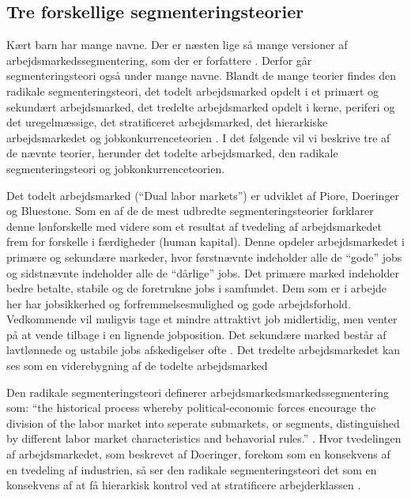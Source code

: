 \subsection{Tre forskellige segmenteringsteorier}

Kært barn har mange navne. Der er næsten lige så mange versioner af arbejdsmarkedssegmentering, som der er forfattere \parencite[77]{Leontaridi1998}. Derfor går segmenteringsteori også under mange navne. Blandt de mange teorier findes den radikale segmenteringsteori, det todelt arbejdsmarked opdelt i et primært og sekundært arbejdsmarked, det tredelte arbejdsmarked opdelt i kerne, periferi og det uregelmæssige, det stratificeret arbejdsmarked, det hierarkiske arbejdsmarkedet og jobkonkurrenceteorien \parencite[1215]{Cain1976}. I det følgende vil vi beskrive tre af de nævnte teorier, herunder det todelte arbejdsmarked, den radikale segmenteringsteori og jobkonkurrenceteorien.

Det todelt arbejdsmarked (“Dual labor markets”) er udviklet af Piore, Doeringer og Bluestone. Som en af de de mest udbredte segmenteringsteorier forklarer denne lønforskelle med videre som et resultat af tvedeling af arbejdsmarkedet frem for forskelle i færdigheder (human kapital). Denne opdeler arbejdsmarkedet i primære og sekundære markeder, hvor førstnævnte indeholder alle de “gode” jobs og sidstnævnte indeholder alle de “dårlige” jobs. Det primære marked indeholder bedre betalte, stabile og de foretrukne jobs i samfundet. Dem som er i arbejde her har jobsikkerhed og forfremmelsesmulighed og gode arbejdsforhold. Vedkommende vil muligvis tage et mindre attraktivt job midlertidig, men venter på at vende tilbage i en lignende jobposition. Det sekundære marked består af lavtlønnede og ustabile jobs afskedigelser ofte \parencite[70]{Doeringer1971}. Det tredelte arbejdsmarkedet kan ses som en viderebygning af de todelte arbejdsmarked

Den radikale segmenteringsteori definerer arbejdsmarkedsmarkedssegmentering som: “the historical process whereby political-economic forces encourage the division of the labor market into seperate submarkets, or segments, distinguished by different labor market characteristics and behavorial rules.” \parencite[359]{Reich1973}. Hvor tvedelingen af arbejdsmarkedet, som beskrevet af Doeringer, forekom som en konsekvens af en tvedeling af industrien, så ser den radikale segmenteringsteori det som en konsekvens af at få hierarkisk kontrol ved at stratificere arbejderklassen \parencite[63]{Leontaridi1998}.

